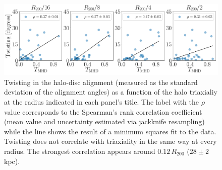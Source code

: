 \documentclass[usenatbib]{mnras}
\begin{document}
\begin{figure}
\begin{center}
\includegraphics[width=1.0\textwidth]{correlations_twisting_triaxiality_MHD.pdf}
\end{center}
\caption{Twisting in the halo-disc alignment (measured as the standard deviation of the alignment angles)
  as a function of the halo triaxialiy at the radius indicated
  in each panel's title.
  The label with the $\rho$ value corresponds to the Spearman's rank
  correlation coefficient (mean value and uncertainty estimated via
  jackknife resampling) while the line shows the result of a
  minimum squares fit to the data.
  Twisting does not correlate with triaxiality in the same way at every
  radius. The strongest correlation appears around $0.12\, R_{200}$ ($28\pm2$ kpc).} 
\label{fig:alignment_correlations}
\end{figure}
\end{document}
